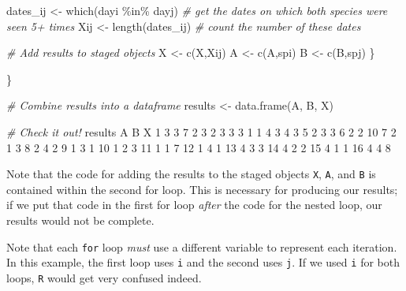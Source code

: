 \documentclass[
]{book}
\newenvironment{Shaded}{\begin{snugshade}}{\end{snugshade}}
\newcommand{\CommentTok}[1]{\textcolor[rgb]{0.56,0.35,0.01}{\textit{#1}}}
\newcommand{\DecValTok}[1]{\textcolor[rgb]{0.00,0.00,0.81}{#1}}
\newcommand{\FunctionTok}[1]{\textcolor[rgb]{0.00,0.00,0.00}{#1}}
\newcommand{\NormalTok}[1]{#1}
\newcommand{\OtherTok}[1]{\textcolor[rgb]{0.56,0.35,0.01}{#1}}
\newcommand{\SpecialCharTok}[1]{\textcolor[rgb]{0.00,0.00,0.00}{#1}}
\begin{document}
\begin{Shaded}
\begin{Highlighting}[]
\NormalTok{    dates\_ij }\OtherTok{\textless{}{-}} \FunctionTok{which}\NormalTok{(dayi  }\SpecialCharTok{\%in\%}\NormalTok{ dayj) }\CommentTok{\# get the dates on which both species were seen 5+ times}
\NormalTok{    Xij }\OtherTok{\textless{}{-}} \FunctionTok{length}\NormalTok{(dates\_ij) }\CommentTok{\# count the number of these dates}
    
    \CommentTok{\# Add results to staged objects}
\NormalTok{    X }\OtherTok{\textless{}{-}} \FunctionTok{c}\NormalTok{(X,Xij) }
\NormalTok{    A }\OtherTok{\textless{}{-}} \FunctionTok{c}\NormalTok{(A,spi)}
\NormalTok{    B }\OtherTok{\textless{}{-}} \FunctionTok{c}\NormalTok{(B,spj)}
\NormalTok{  \}}

\NormalTok{\}}

\CommentTok{\# Combine results into a dataframe}
\NormalTok{results }\OtherTok{\textless{}{-}} \FunctionTok{data.frame}\NormalTok{(A, B, X)}

\CommentTok{\# Check it out!}
\NormalTok{results}
\NormalTok{   A B  X}
\DecValTok{1}  \DecValTok{3} \DecValTok{3}  \DecValTok{7}
\DecValTok{2}  \DecValTok{3} \DecValTok{2}  \DecValTok{3}
\DecValTok{3}  \DecValTok{3} \DecValTok{1}  \DecValTok{1}
\DecValTok{4}  \DecValTok{3} \DecValTok{4}  \DecValTok{3}
\DecValTok{5}  \DecValTok{2} \DecValTok{3}  \DecValTok{3}
\DecValTok{6}  \DecValTok{2} \DecValTok{2} \DecValTok{10}
\DecValTok{7}  \DecValTok{2} \DecValTok{1}  \DecValTok{3}
\DecValTok{8}  \DecValTok{2} \DecValTok{4}  \DecValTok{2}
\DecValTok{9}  \DecValTok{1} \DecValTok{3}  \DecValTok{1}
\DecValTok{10} \DecValTok{1} \DecValTok{2}  \DecValTok{3}
\DecValTok{11} \DecValTok{1} \DecValTok{1}  \DecValTok{7}
\DecValTok{12} \DecValTok{1} \DecValTok{4}  \DecValTok{1}
\DecValTok{13} \DecValTok{4} \DecValTok{3}  \DecValTok{3}
\DecValTok{14} \DecValTok{4} \DecValTok{2}  \DecValTok{2}
\DecValTok{15} \DecValTok{4} \DecValTok{1}  \DecValTok{1}
\DecValTok{16} \DecValTok{4} \DecValTok{4}  \DecValTok{8}
\end{Highlighting}
\end{Shaded}

Note that the code for adding the results to the staged objects \texttt{X}, \texttt{A}, and \texttt{B} is contained within the second for loop. This is necessary for producing our results; if we put that code in the first for loop \emph{after} the code for the nested loop, our results would not be complete.

Note that each \texttt{for} loop \emph{must} use a different variable to represent each iteration. In this example, the first loop uses \texttt{i} and the second uses \texttt{j}. If we used \texttt{i} for both loops, \texttt{R} would get very confused indeed.
\end{document}
